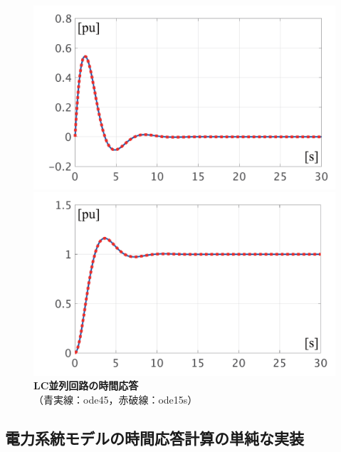 \documentclass[tombow,dvipdfmx]{corona-a5-1.1}
\begin{document}
\begin{例}[簡単な微分代数方程式系の数値解法]
\begin{figure}[t]
  \centering
  {
    \begin{minipage}{0.49\linewidth}
      \centering
      \includegraphics[width = 1.0\linewidth]{figs/iL}
    \end{minipage}
    \begin{minipage}{0.49\linewidth}
      \centering
      \includegraphics[width = 1.0\linewidth]{figs/vC}
    \end{minipage}
    \medskip
    \caption{\textbf{LC並列回路の時間応答}
      \\ \centering（青実線：ode45，赤破線：ode15s）}
    \label{fig:solution_dae}
  }
  \medskip
\end{figure}
\end{例}




\subsection{電力系統モデルの時間応答計算の単純な実装}
\end{document}
